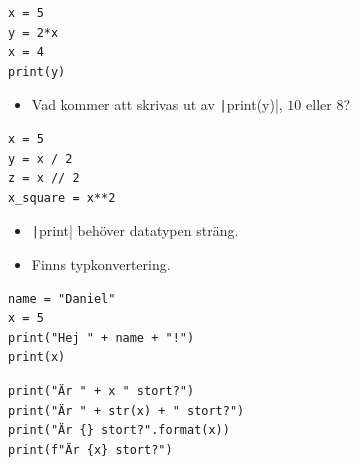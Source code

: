 \begin{frame}[fragile]
  \begin{example}
    \begin{verbatim}
x = 5
y = 2*x
x = 4
print(y)
    \end{verbatim}
  \end{example}

  \begin{exercise}
    \begin{itemize}
      \item Vad kommer att skrivas ut av \texttt|print(y)|,
        \(10\) eller \(8\)?
    \end{itemize}
  \end{exercise}
\end{frame}

\begin{frame}[fragile]
  \begin{example}
    \begin{verbatim}
x = 5
y = x / 2
z = x // 2
x_square = x**2
    \end{verbatim}
  \end{example}
\end{frame}

\begin{frame}[fragile]
  \begin{remark}
    \begin{itemize}
      \item \texttt|print| behöver datatypen sträng.
      \item Finns typkonvertering.
    \end{itemize}
  \end{remark}

  \begin{example}
    \begin{verbatim}
name = "Daniel"
x = 5
print("Hej " + name + "!")
print(x)
    \end{verbatim}
  \end{example}
\end{frame}

\begin{frame}[fragile]
  \begin{example}
    \begin{verbatim}
print("Är " + x " stort?")
print("Är " + str(x) + " stort?")
print("Är {} stort?".format(x))
print(f"Är {x} stort?")
    \end{verbatim}
  \end{example}
\end{frame}



